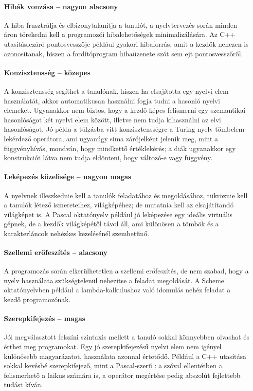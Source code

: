 \paragraph{Hibák vonzása -- nagyon alacsony} A hiba frusztrálja és elbizonytalanítja a tanulót, a nyelvtervezés során minden áron törekedni kell a programozói hibalehetőségek minimalizálására.
Az C++ utasításlezáró pontosvesszője például gyakori hibaforrás, amit a kezdők nehezen is azonosítanak, hiszen a  fordítóprogram hibaüzenete szót sem ejt pontosvesszőről.

\paragraph{Konzisztensség -- közepes} A konzisztensség segíthet a tanulónak, hiszen ha elsajította egy nyelvi elem használatát, akkor automatikusan használni fogja tudni a hasonló nyelvi elemeket.
Ugyanakkor nem biztos, hogy a kezdő képes felismerni egy szemantikai hasonlóságot két nyelvi elem között, illetve nem tudja kihasználni az elvi hasonlóságot.
Jó példa a túlzásba vitt konzisztensségre a Turing nyelv tömbelem-lekérdező operátora, ami ugyanúgy sima zárójelként jelenik meg, mint a függvényhívás, mondván, hogy mindkettő értéklekérés; a diák ugyanakkor egy  konstrukciót látva nem tudja eldönteni, hogy  változó-e vagy függvény.

\paragraph{Leképezés közelisége -- nagyon magas} A nyelvnek illeszkednie kell a tanulók feladatához és megoldásához, tükröznie kell a tanulók létező ismereteihez, világképéhez; de mutatnia kell az elsajátítandó világképet is.
A Pascal oktatónyelv például jó leképezése egy ideális virtuális gépnek, de a kezdők világképétől távol áll, ami különösen a tömbök és a karakterláncok nehézkes kezelésénél szembetűnő.

\paragraph{Szellemi erőfeszítés -- alacsony} A programozás során elkerülhetetlen a szellemi erőfeszítés, de nem szabad, hogy a nyelv használata szükségtelenül nehezítse a feladat megoldását. A Scheme oktatónyelvben például a lambda-kalkulushoz való idomulás nehéz feladat a kezdő programozónak.

\paragraph{Szerepkifejezés -- magas} Jól megválasztott felszíni szintaxis mellett a tanuló sokkal könnyebben olvashat és érthet meg programokat.
Egy jó szerepkifejezésű nyelvi elem nem igényel különösebb magyarázatot, használata azonnal értetődő.
Például a C++  utasítása sokkal kevésbé szerepkifejező, mint a Pascal-szerű : a  szóval ellentétben a  felismerhető a laikus számára is, a \cls{<<} operátor megértése pedig abszolút fejlettebb tudást kíván.

